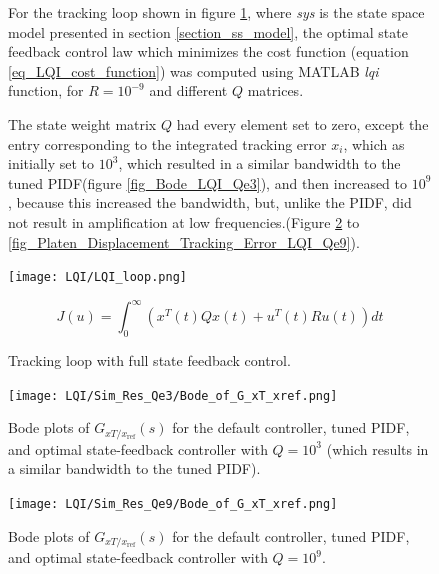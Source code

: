 \documentclass[9pt]{extarticle}
\begin{document}
\begin{figure}[H]
\begin{minipage}{0.49\textwidth}
For the tracking loop shown in figure \ref{fig_LQI_loop}, where \emph{sys} is the state space model presented in section \ref{section_ss_model}, the optimal state feedback control law which minimizes the cost function (equation \ref{eq_LQI_cost_function}) was computed using MATLAB \emph{lqi} function, for $R=10^{-9}$ and different $Q$ matrices.

The state weight matrix $Q$ had every element set to zero, except the entry corresponding to the integrated tracking error $x_i$, which as initially set to $10^3$, which resulted in a similar bandwidth to the tuned PIDF(figure \ref{fig_Bode_LQI_Qe3}), and then increased to $10^9$, because this increased the bandwidth, but, unlike the PIDF, did not result in amplification at low frequencies.(Figure \ref{fig_Bode_LQI_Qe9} to \ref{fig_Platen_Displacement_Tracking_Error_LQI_Qe9}).

\end{minipage}
\hfill
\begin{minipage}{0.49\textwidth}
    \centering
    \texttt{[image: LQI/LQI\_loop.png]}
    \caption{Tracking loop with full state feedback control.}
    \label{fig_LQI_loop}

    \begin{equation}
     J(u) = \int ^{\infty}_0 (x^{T}(t)Qx(t) + u^{T}(t)Ru(t)) dt 
     \label{eq_LQI_cost_function}
    \end{equation} 
    \end{minipage}
\end{figure}



    
\begin{figure}[H]
\begin{minipage}{0.49\textwidth}
    \centering
    \texttt{[image: LQI/Sim\_Res\_Qe3/Bode\_of\_G\_xT\_xref.png]}
    \caption{Bode plots of $G_ {xT/x_{\text{ref}}}(s)$ for the default controller, tuned PIDF, and optimal state-feedback controller with $Q=10^3$ (which results in a similar bandwidth to the tuned PIDF).}
    \label{fig_Bode_LQI_Qe3} 
\end{minipage}
\hfill
\begin{minipage}{0.49\textwidth}
    \centering
    \texttt{[image: LQI/Sim\_Res\_Qe9/Bode\_of\_G\_xT\_xref.png]}
    \caption{Bode plots of $G_ {xT/x_{\text{ref}}}(s)$ for the default controller, tuned PIDF, and optimal state-feedback controller with $Q=10^9$.}
    \label{fig_Bode_LQI_Qe9}
\end{minipage}
\end{figure}
\end{document}
